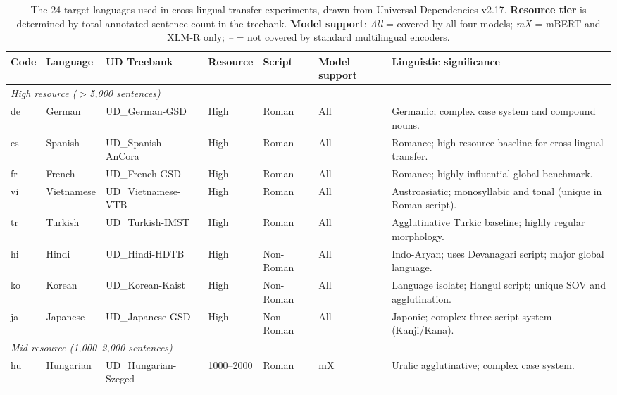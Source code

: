 \begin{table}[ht]
\centering
\footnotesize
\setlength{\tabcolsep}{4pt}
\caption{The 24 target languages used in cross-lingual transfer experiments,
         drawn from Universal Dependencies v2.17.
         \textbf{Resource tier} is determined by total annotated sentence count
         in the treebank.
         \textbf{Model support}: \textit{All} = covered by all four models;
         \textit{mX} = mBERT and XLM-R only; \textit{--} = not covered
         by standard multilingual encoders.}
\label{tab:languages}
\begin{tabular}{llllllp{6.2cm}}
\toprule
Code & Language & UD Treebank & Resource & Script & Model support & Linguistic significance \\
\midrule
\multicolumn{7}{l}{\textit{High resource ($>$5{,}000 sentences)}} \\
\midrule
de  & German        & UD\_German-GSD           & High & Roman     & All  & Germanic; complex case system and compound nouns. \\
es  & Spanish       & UD\_Spanish-AnCora        & High & Roman     & All  & Romance; high-resource baseline for cross-lingual transfer. \\
fr  & French        & UD\_French-GSD            & High & Roman     & All  & Romance; highly influential global benchmark. \\
vi  & Vietnamese    & UD\_Vietnamese-VTB        & High & Roman     & All  & Austroasiatic; monosyllabic and tonal (unique in Roman script). \\
tr  & Turkish       & UD\_Turkish-IMST          & High & Roman     & All  & Agglutinative Turkic baseline; highly regular morphology. \\
hi  & Hindi         & UD\_Hindi-HDTB            & High & Non-Roman & All  & Indo-Aryan; uses Devanagari script; major global language. \\
ko  & Korean        & UD\_Korean-Kaist          & High & Non-Roman & All  & Language isolate; Hangul script; unique SOV and agglutination. \\
ja  & Japanese      & UD\_Japanese-GSD          & High & Non-Roman & All  & Japonic; complex three-script system (Kanji/Kana). \\
\midrule
\multicolumn{7}{l}{\textit{Mid resource (1{,}000--2{,}000 sentences)}} \\
\midrule
hu  & Hungarian     & UD\_Hungarian-Szeged      & 1000--2000 & Roman     & mX & Uralic agglutinative; complex case system. \\

\end{tabular}
\end{table}
